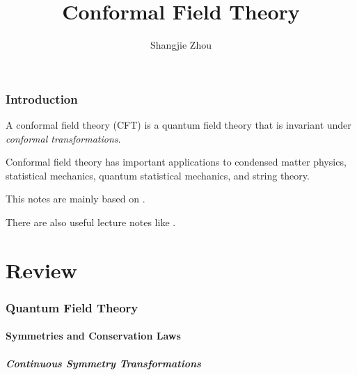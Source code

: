 \documentclass[10pt]{article}
\begin{document}
\title{Conformal Field Theory}
\author{Shangjie Zhou}

\maketitle

\section*{Introduction}
A conformal field theory (CFT) is a quantum field theory that is invariant under \textit{conformal transformations}.

Conformal field theory has important applications to condensed matter physics, statistical mechanics, quantum statistical mechanics, and string theory. 

This notes are mainly based on \cite{DiFrancesco:1997nk}.

There are also useful lecture notes like \cite{Qualls:2015qjb,Tong:2009np}.

\part{Review}
\section{Quantum Field Theory}
\subsection{Symmetries and Conservation Laws}
\subsubsection{Continuous Symmetry Transformations}
\end{document}
